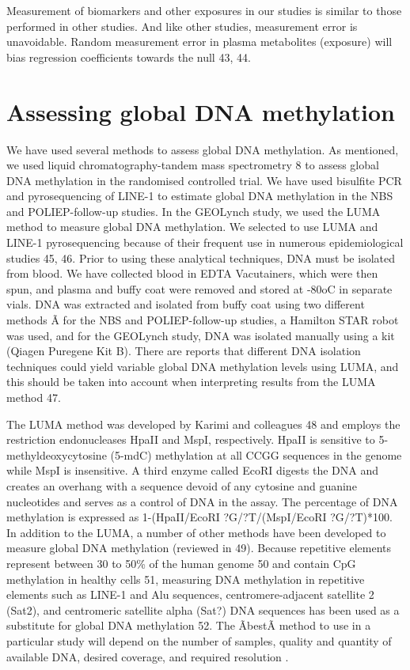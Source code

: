 \noindent Measurement of biomarkers and other exposures in our studies is similar to those performed in other studies. And like other studies, measurement error is unavoidable. Random measurement error in plasma metabolites (exposure) will bias regression coefficients towards the null 43, 44. 
 
\section{Assessing global DNA methylation} %
We have used several methods to assess global DNA methylation. As mentioned, we used liquid chromatography-tandem mass spectrometry 8 to assess global DNA methylation in the randomised controlled trial. We have used bisulfite PCR and pyrosequencing of LINE-1 to estimate global DNA methylation in the NBS and POLIEP-follow-up studies. In the GEOLynch study, we used the LUMA method to measure global DNA methylation. We selected to use LUMA and LINE-1 pyrosequencing because of their frequent use in numerous epidemiological studies 45, 46. Prior to using these analytical techniques, DNA must be isolated from blood. We have collected blood in EDTA Vacutainers, which were then spun, and plasma and buffy coat were removed and stored at -80oC in separate vials. DNA was extracted and isolated from buffy coat using two different methods Ã for the NBS and POLIEP-follow-up studies, a Hamilton STAR robot was used, and for the GEOLynch study, DNA was isolated manually using a kit (Qiagen Puregene Kit B). There are reports 
that different DNA isolation techniques could yield variable global DNA methylation levels using LUMA, and this should be taken into account when interpreting results from the LUMA method 47. 
 
\noindent The LUMA method was developed by Karimi and colleagues 48 and employs the restriction endonucleases HpaII and MspI, respectively. HpaII is sensitive to 5-methyldeoxycytosine (5-mdC) methylation at all CCGG sequences in the genome while MspI is insensitive. A third enzyme called EcoRI digests the DNA and creates an overhang with a sequence devoid of any cytosine and guanine nucleotides and serves as a control of DNA in the assay. The percentage of DNA methylation is expressed as 1-(HpaII/EcoRI ?G/?T/(MspI/EcoRI ?G/?T)*100. In addition to the LUMA, a number of other methods have been developed to measure global DNA methylation (reviewed in 49). Because repetitive elements represent between 30 to 50\% of the human genome 50 and contain CpG methylation in healthy cells 51, measuring DNA methylation in repetitive elements such as LINE-1 and Alu sequences, centromere-adjacent satellite 2 (Sat2), and centromeric satellite alpha (Sat?) DNA sequences has been used as a substitute for global DNA methylation 
52. The ÃbestÃ method to use in a particular study will depend on the number of samples, quality and quantity of available DNA, desired coverage, and required resolution \cite{c749}. 
 
